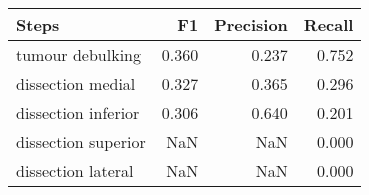 \begin{tabular}{lrrr}
\toprule
Steps & F1 & Precision & Recall \\
\midrule
tumour debulking & 0.360 & 0.237 & 0.752 \\
dissection medial & 0.327 & 0.365 & 0.296 \\
dissection inferior & 0.306 & 0.640 & 0.201 \\
dissection superior & NaN & NaN & 0.000 \\
dissection lateral & NaN & NaN & 0.000 \\
\bottomrule
\end{tabular}
